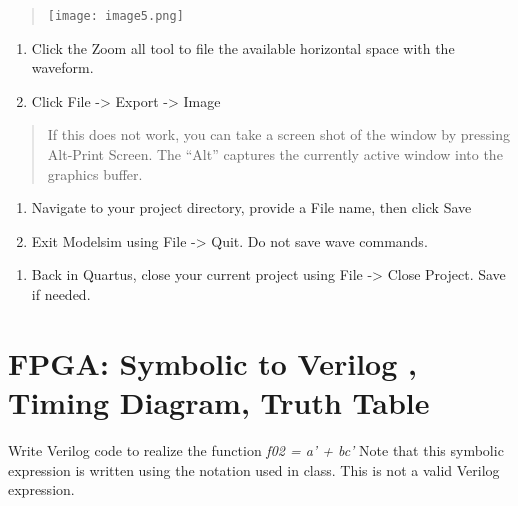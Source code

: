 \begin{quote}
\texttt{[image: image5.png]}
\end{quote}

\begin{enumerate}
\def\labelenumi{\alph{enumi}.}
\setcounter{enumi}{2}
\item
  Click the Zoom all tool to file the available horizontal space with
  the waveform.
\item
  Click File -\textgreater{} Export -\textgreater{} Image
\end{enumerate}

\begin{quote}
If this does not work, you can take a screen shot of the window by
pressing Alt-Print Screen. The ``Alt'' captures the currently active
window into the graphics buffer.
\end{quote}

\begin{enumerate}
\def\labelenumi{\alph{enumi}.}
\setcounter{enumi}{4}
\item
  Navigate to your project directory, provide a File name, then click
  Save
\item
  Exit Modelsim using File -\textgreater{} Quit. Do not save wave
  commands.
\end{enumerate}

\begin{enumerate}
\def\labelenumi{\arabic{enumi}.}
\setcounter{enumi}{23}
\item
  Back in Quartus, close your current project using File -\textgreater{}
  Close Project. Save if needed.
\end{enumerate}


\section{FPGA: Symbolic to Verilog , Timing Diagram, Truth Table}
Write Verilog code to realize the function \emph{f02 = a' + bc'} Note
that this symbolic expression is written using the notation used in
class. This is not a valid Verilog expression.

